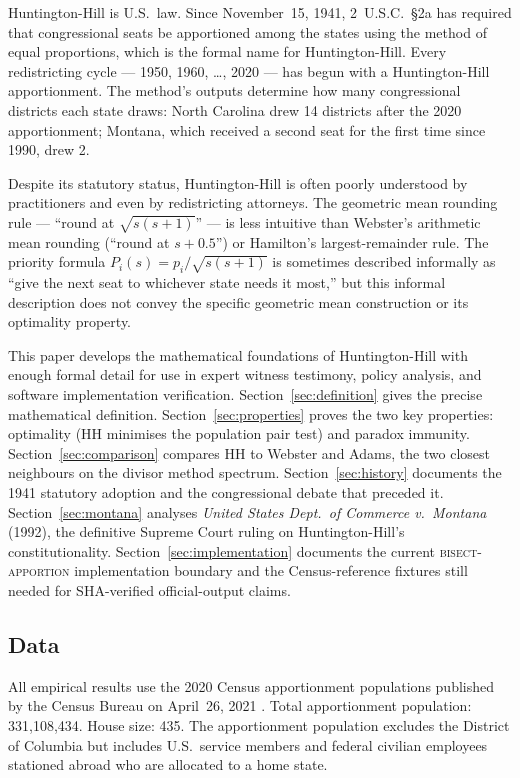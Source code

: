 Huntington-Hill is U.S.\ law.
Since November~15, 1941, 2~U.S.C.\ \S2a has required that congressional
seats be apportioned among the states using the method of equal proportions,
which is the formal name for Huntington-Hill.
Every redistricting cycle --- 1950, 1960, \ldots, 2020 --- has begun with
a Huntington-Hill apportionment.
The method's outputs determine how many congressional districts each state
draws: North Carolina drew 14 districts after the 2020 apportionment;
Montana, which received a second seat for the first time since 1990,
drew 2.

Despite its statutory status, Huntington-Hill is often poorly understood
by practitioners and even by redistricting attorneys.
The geometric mean rounding rule --- ``round at $\sqrt{s(s+1)}$'' ---
is less intuitive than Webster's arithmetic mean rounding (``round at
$s+0.5$'') or Hamilton's largest-remainder rule.
The priority formula $P_i(s) = p_i/\sqrt{s(s+1)}$ is sometimes
described informally as ``give the next seat to whichever state needs
it most,'' but this informal description does not convey the specific
geometric mean construction or its optimality property.

This paper develops the mathematical foundations of Huntington-Hill
with enough formal detail for use in expert witness testimony,
policy analysis, and software implementation verification.
Section~\ref{sec:definition} gives the precise mathematical definition.
Section~\ref{sec:properties} proves the two key properties:
optimality (HH minimises the population pair test) and paradox immunity.
Section~\ref{sec:comparison} compares HH to Webster and Adams,
the two closest neighbours on the divisor method spectrum.
Section~\ref{sec:history} documents the 1941 statutory adoption
and the congressional debate that preceded it.
Section~\ref{sec:montana} analyses \textit{United States Dept.\ of
Commerce v.\ Montana} (1992), the definitive Supreme Court ruling on
Huntington-Hill's constitutionality.
Section~\ref{sec:implementation} documents the current \textsc{bisect-apportion}
implementation boundary and the Census-reference fixtures still needed for
SHA-verified official-output claims.

\subsection{Data}

All empirical results use the 2020 Census apportionment populations
published by the Census Bureau on April~26, 2021
\citep{census2020apportionment}.
Total apportionment population: 331{,}108{,}434.
House size: 435.
The apportionment population excludes the District of Columbia
but includes U.S.\ service members and federal civilian employees
stationed abroad who are allocated to a home state.
